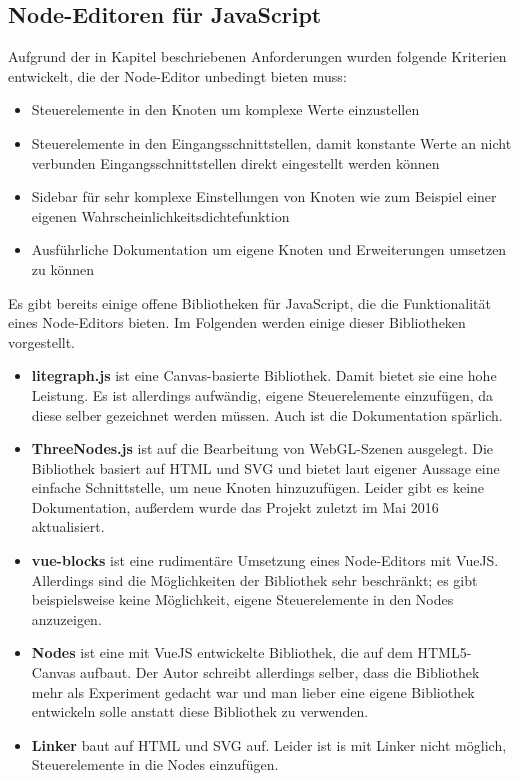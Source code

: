 \subsection{Node-Editoren für JavaScript}

Aufgrund der in Kapitel  beschriebenen Anforderungen wurden folgende Kriterien entwickelt, die der Node-Editor unbedingt bieten muss:
\begin{itemize}
    \item Steuerelemente in den Knoten um komplexe Werte einzustellen
    \item Steuerelemente in den Eingangsschnittstellen, damit konstante Werte an nicht verbunden Eingangsschnittstellen direkt eingestellt werden können
    \item Sidebar für sehr komplexe Einstellungen von Knoten wie zum Beispiel einer eigenen Wahrscheinlichkeitsdichtefunktion
    \item Ausführliche Dokumentation um eigene Knoten und Erweiterungen umsetzen zu können
\end{itemize}

Es gibt bereits einige offene Bibliotheken für JavaScript, die die Funktionalität eines Node-Editors bieten. Im Folgenden werden einige dieser Bibliotheken vorgestellt.

\begin{itemize}
    \item \textbf{litegraph.js} ist eine Canvas-basierte Bibliothek. Damit bietet sie eine hohe Leistung. Es ist allerdings aufwändig, eigene Steuerelemente einzufügen, da diese selber gezeichnet werden müssen. Auch ist die Dokumentation spärlich. \cite{litegraph}
    \item \textbf{ThreeNodes.js} ist auf die Bearbeitung von WebGL-Szenen ausgelegt. Die Bibliothek basiert auf HTML und SVG und bietet laut eigener Aussage eine einfache Schnittstelle, um neue Knoten hinzuzufügen. Leider gibt es keine Dokumentation, außerdem wurde das Projekt zuletzt im Mai 2016 aktualisiert. \cite{threenodes}
    \item \textbf{vue-blocks} ist eine rudimentäre Umsetzung eines Node-Editors mit VueJS. Allerdings sind die Möglichkeiten der Bibliothek sehr beschränkt; es gibt beispielsweise keine Möglichkeit, eigene Steuerelemente in den Nodes anzuzeigen. \cite{vueblocks}
    \item \textbf{Nodes} ist eine mit VueJS entwickelte Bibliothek, die auf dem HTML5-Canvas aufbaut. Der Autor schreibt allerdings selber, dass die Bibliothek mehr als Experiment gedacht war und man lieber eine eigene Bibliothek entwickeln solle anstatt diese Bibliothek zu verwenden. \cite{nodes}
    \item \textbf{Linker} baut auf HTML und SVG auf. Leider ist is mit Linker nicht möglich, Steuerelemente in die Nodes einzufügen. \cite{linker}
\end{itemize}


